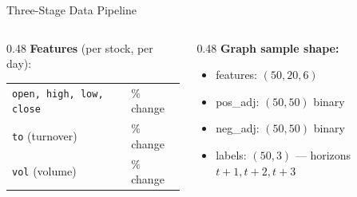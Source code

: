 \documentclass[aspectratio=169, 10pt]{beamer}
\begin{document}
\begin{frame}{Three-Stage Data Pipeline}
  \vspace{0.4cm}
  \begin{columns}[T]
    \begin{column}{0.48\textwidth}
      \textbf{Features} (per stock, per day):
      \begin{tabular}{ll}
        \texttt{open, high, low, close} & \% change \\
        \texttt{to} (turnover) & \% change \\
        \texttt{vol} (volume) & \% change \\
      \end{tabular}
    \end{column}
    \begin{column}{0.48\textwidth}
      \textbf{Graph sample shape:}
      \begin{itemize}
        \item features: $(50, 20, 6)$
        \item pos\_adj: $(50, 50)$ binary
        \item neg\_adj: $(50, 50)$ binary
        \item labels: $(50, 3)$ — horizons $t{+}1, t{+}2, t{+}3$
      \end{itemize}
    \end{column}
  \end{columns}
\end{frame}
\end{document}
